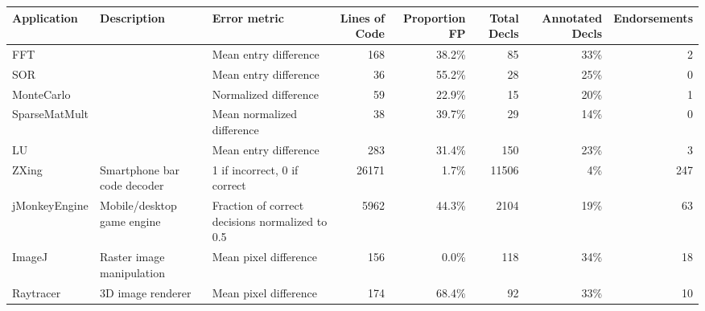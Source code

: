 
\begin{tabular}{l >{\raggedright}p{1in} >{\raggedright}p{1.3in} r r r r r}
\toprule
Application & Description & Error metric &
Lines of Code & Proportion FP &
Total Decls &
Annotated Decls & Endorsements \tabularnewline
\midrule
FFT & \multirow{5}{1.5in}{SciMark2 kernels} & Mean entry difference  & 168 & 38.2\% & 85 & 33\% & 2 \tabularnewline
SOR & & Mean entry difference  & 36 & 55.2\% & 28 & 25\% & 0 \tabularnewline
MonteCarlo & & Normalized difference  & 59 & 22.9\% & 15 & 20\% & 1 \tabularnewline
SparseMatMult & & Mean normalized difference  & 38 & 39.7\% & 29 & 14\% & 0 \tabularnewline
LU & & Mean entry difference  & 283 & 31.4\% & 150 & 23\% & 3 \tabularnewline[1.5ex]
ZXing & Smartphone bar code decoder & 1 if incorrect, 0 if correct  & 26171 & 1.7\% & 11506 & 4\% & 247 \tabularnewline
jMonkeyEngine & Mobile/desktop game engine & Fraction of correct decisions normalized to 0.5  & 5962 & 44.3\% & 2104 & 19\% & 63 \tabularnewline
ImageJ & Raster image manipulation & Mean pixel difference  & 156 & 0.0\% & 118 & 34\% & 18 \tabularnewline
Raytracer & 3D image renderer & Mean pixel difference  & 174 & 68.4\% & 92 & 33\% & 10 \tabularnewline
\bottomrule
\end{tabular}
